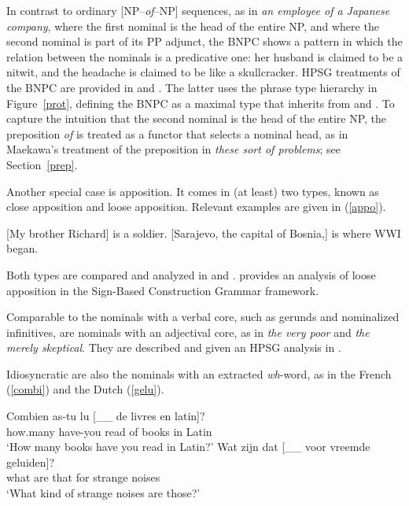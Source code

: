 \documentclass[output=paper
	        ,collection
	        ,collectionchapter
 	        ,biblatex
                ,babelshorthands
                ,newtxmath
                ,draftmode
                ,colorlinks, citecolor=brown
]{langscibook}
\begin{document}
\noindent
In contrast to ordinary [NP--\emph{of}--NP] sequences, 
as in \emph{an employee of a Japanese company}, where the 
first nominal is the head of the entire NP, and where the second 
nominal is part of its PP adjunct, the BNPC shows a pattern
in which the relation between the nominals is a predicative one: 
her husband is claimed to be a nitwit, and the headache is claimed to be 
like a skullcracker. HPSG treatments of the BNPC are provided in
\citet{KimSells14} and \citet{VanEynde18}. The latter uses 
the phrase type hierarchy in Figure~\ref{prot}, defining the BNPC as 
a maximal type that inherits from  and 
. To capture the intuition that the second
nominal is the head of the entire NP, the preposition \emph{of} is 
treated as a functor that selects a nominal head, as in Maekawa's treatment of 
the preposition in \emph{these sort of problems}; see Section~\ref{prep}. 

Another special case is apposition. It comes in (at least) two types, known as 
close apposition and loose apposition. Relevant examples are given in (\ref{appo}). 

\begin{exe} 
\ex\label{appo} 
\begin{xlist} 
\ex  {}[My brother Richard] is a soldier.  
\ex  {}[Sarajevo, the capital of Bosnia,] is where WWI began.
\end{xlist} 
\end{exe}

\noindent
Both types are compared and analyzed in \citet{Kim12} and \citet{Kim14}. 
\citet{VanEyndeKim16} provides an analysis of loose apposition in the 
Sign-Based Construction Grammar framework. 

Comparable to the nominals with a verbal core, such as gerunds and nominalized 
infinitives, are nominals with an adjectival core, as in \emph{the very poor} and 
\emph{the merely skeptical}. They are described and given an HPSG analysis 
in \citet{ArnoldSpencer2015}.

Idiosyncratic are also the nominals with an extracted \emph{wh}-word, as in 
the French (\ref{combi}) and the Dutch (\ref{gelu}). 

\begin{exe} 
\ex\label{combi}  
\gll   Combien as-tu lu [\_\_ de livres en latin]?  \\
       how.many have-you read {} of books in Latin  \\ 
\trans `How many books have you read in Latin?' 
\ex\label{gelu}
\gll   Wat zijn dat [\_\_ voor vreemde geluiden]? \\
       what are that {} for strange noises        \\ 
\trans `What kind of strange noises are those?'  
\end{exe} 
\end{document}
